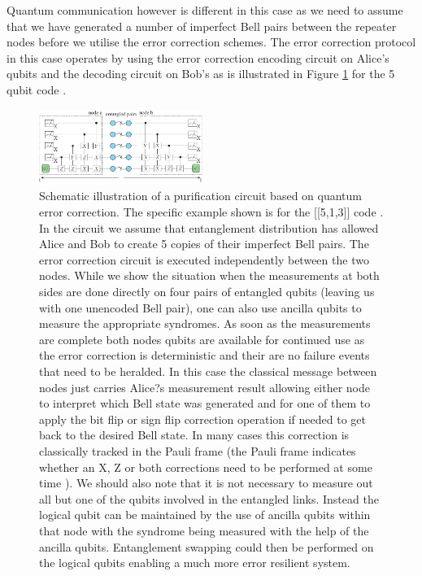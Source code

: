 \documentclass[twocolumn, aps, rmp, amsmath, amssymb, nofootinbib, superscriptaddress, longbibliography, floatfix, table-of-contents, eqsecnum]{revtex4-1}
\begin{document}
Quantum communication however is different in this case as we need to assume that we have generated a number of imperfect Bell pairs between the repeater nodes before we utilise the error correction schemes. The error correction protocol in this case operates by using the error correction encoding circuit on Alice's qubits and the decoding circuit on Bob's \cite{Aschauer2004} as is illustrated in Figure \ref{fig7} for the 5 qubit code \cite{Bennettr1996a,Knill97}.
\begin{figure}[!htb]
\begin{center}
\includegraphics[width=0.475\textwidth]{repeaters_7}
\end{center}
\caption{Schematic illustration of a purification circuit based on quantum error correction. The specific example shown is for the [[5,1,3]] code \cite{Bennettr1996a,Knill97}. In the circuit we assume that entanglement distribution has allowed Alice and Bob to create 5 copies of their imperfect Bell pairs. The error correction circuit is  executed independently between the two nodes. While we show the situation when the measurements at both sides are done directly on four pairs of entangled qubits (leaving us with one unencoded Bell pair), one can also use ancilla qubits to measure the appropriate syndromes.  As soon as the measurements are complete both nodes qubits are available for continued use as the error correction is deterministic and their are no failure events that need to be heralded. In this case the classical message between nodes just carries Alice?s measurement result allowing either node to interpret which Bell state was generated and for one of them to apply the bit flip or sign flip correction operation if needed to get back to the desired Bell state. In many cases this correction is classically tracked in the Pauli frame (the Pauli frame indicates whether an X, Z or both corrections need to be performed at some time \cite{jiang09,munro10}). We should also note that it is not necessary to measure out all but one of the qubits involved in the entangled links. Instead the logical qubit can be maintained by the use of ancilla qubits within that node with the syndrome being measured with the help of the ancilla qubits. Entanglement swapping could then be performed on the logical qubits enabling a much more error resilient system.
}
\label{fig7}
\end{figure} 
\end{document}
